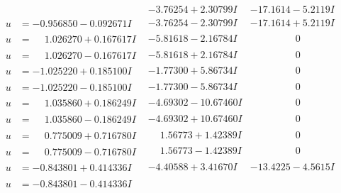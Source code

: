 \documentclass[1p]{elsarticle_modified}
\theoremstyle{definition}
\begin{document}
$$\begin{array}{c|c|c}
 & -3.76254 + 2.30799 I & -17.1614 - 5.2119 I \\ \hline\begin{aligned}
u &= -0.956850 - 0.092671 I\end{aligned}
 & -3.76254 - 2.30799 I & -17.1614 + 5.2119 I \\ \hline\begin{aligned}
u &= \phantom{-}1.026270 + 0.167617 I\end{aligned}
 & -5.81618 - 2.16784 I & \phantom{-0.000000 } 0 \\ \hline\begin{aligned}
u &= \phantom{-}1.026270 - 0.167617 I\end{aligned}
 & -5.81618 + 2.16784 I & \phantom{-0.000000 } 0 \\ \hline\begin{aligned}
u &= -1.025220 + 0.185100 I\end{aligned}
 & -1.77300 + 5.86734 I & \phantom{-0.000000 } 0 \\ \hline\begin{aligned}
u &= -1.025220 - 0.185100 I\end{aligned}
 & -1.77300 - 5.86734 I & \phantom{-0.000000 } 0 \\ \hline\begin{aligned}
u &= \phantom{-}1.035860 + 0.186249 I\end{aligned}
 & -4.69302 - 10.67460 I & \phantom{-0.000000 } 0 \\ \hline\begin{aligned}
u &= \phantom{-}1.035860 - 0.186249 I\end{aligned}
 & -4.69302 + 10.67460 I & \phantom{-0.000000 } 0 \\ \hline\begin{aligned}
u &= \phantom{-}0.775009 + 0.716780 I\end{aligned}
 & \phantom{-}1.56773 + 1.42389 I & \phantom{-0.000000 } 0 \\ \hline\begin{aligned}
u &= \phantom{-}0.775009 - 0.716780 I\end{aligned}
 & \phantom{-}1.56773 - 1.42389 I & \phantom{-0.000000 } 0 \\ \hline\begin{aligned}
u &= -0.843801 + 0.414336 I\end{aligned}
 & -4.40588 + 3.41670 I & -13.4225 - 4.5615 I \\ \hline\begin{aligned}
u &= -0.843801 - 0.414336 I\end{aligned}

\end{array}$$
\end{document}
